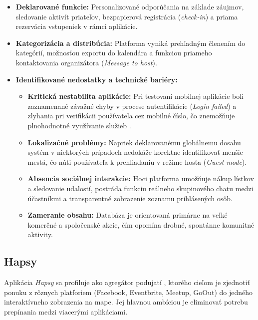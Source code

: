 \begin{itemize}[noitemsep]
    \item \textbf{Deklarované funkcie:} Personalizované odporúčania na základe záujmov, sledovanie aktivít priateľov, bezpapierová registrácia (\textit{check-in}) a priama rezervácia vstupeniek v rámci aplikácie.
    \item \textbf{Kategorizácia a distribúcia:} Platforma vyniká prehľadným členením do kategórií, možnosťou exportu do kalendára a funkciou priameho kontaktovania organizátora (\textit{Message to host}). 
    \item \textbf{Identifikované nedostatky a technické bariéry:} 
    \begin{itemize}[noitemsep]
        \item \textbf{Kritická nestabilita aplikácie:} Pri testovaní mobilnej aplikácie boli zaznamenané závažné chyby v procese autentifikácie (\textit{Login failed}) a zlyhania pri verifikácii používateľa cez mobilné číslo, čo znemožňuje plnohodnotné využívanie služieb \cite{allevents_play}.
        \item \textbf{Lokalizačné problémy:} Napriek deklarovanému globálnemu dosahu systém v niektorých prípadoch nedokáže korektne identifikovať menšie mestá, čo núti používateľa k prehliadaniu v režime hosťa (\textit{Guest mode}).
        \item \textbf{Absencia sociálnej interakcie:} Hoci platforma umožňuje nákup lístkov a sledovanie udalostí, postráda funkciu reálneho skupinového chatu medzi účastníkmi a transparentné zobrazenie zoznamu prihlásených osôb.
        \item \textbf{Zameranie obsahu:} Databáza je orientovaná primárne na veľké komerčné a spoločenské akcie, čím opomína drobné, spontánne komunitné aktivity.
    \end{itemize}
\end{itemize}



\subsection{Hapsy}
Aplikácia \textit{Hapsy} sa profiluje ako agregátor podujatí , ktorého cieľom je zjednotiť ponuku z rôznych platforiem (Facebook, Eventbrite, Meetup, GoOut) do jedného interaktívneho zobrazenia na mape. Jej hlavnou ambíciou je eliminovať potrebu prepínania medzi viacerými aplikáciami.

